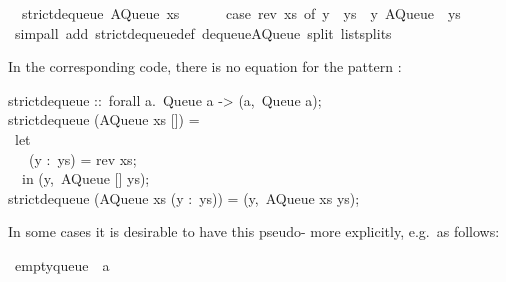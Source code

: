 \begin{isabellebody}
\ \ {\isachardoublequoteopen}strict{\isacharunderscore}dequeue\ {\isacharparenleft}AQueue\ xs\ {\isacharbrackleft}{\isacharbrackright}{\isacharparenright}\ {\isacharequal}\isanewline
\ \ \ \ {\isacharparenleft}case\ rev\ xs\ of\ y\ {\isacharhash}\ ys\ {\isasymRightarrow}\ {\isacharparenleft}y{\isacharcomma}\ AQueue\ {\isacharbrackleft}{\isacharbrackright}\ ys{\isacharparenright}{\isacharparenright}{\isachardoublequoteclose}\isanewline
\ \ \isamarkupfalse%
\ {\isacharparenleft}simp{\isacharunderscore}all\ add{\isacharcolon}\ strict{\isacharunderscore}dequeue{\isacharunderscore}def\ dequeue{\isacharunderscore}AQueue\ split{\isacharcolon}\ list{\isachardot}splits{\isacharparenright}%
\endisatagquote
{\isafoldquote}%
%
\isadelimquote
%
\endisadelimquote
%
\begin{isamarkuptext}%
\noindent In the corresponding code, there is no equation
  for the pattern :%
\end{isamarkuptext}%
\isamarkuptrue%
%
\isadelimquote
%
\endisadelimquote
%
\isatagquote
%
\begin{isamarkuptext}%
\isatypewriter%
\noindent%
\hspace*{0pt}strict{}dequeue ::~forall a.~Queue a -> (a,~Queue a);\\
\hspace*{0pt}strict{}dequeue (AQueue xs []) =\\
\hspace*{0pt} ~let {}\\
\hspace*{0pt} ~~~(y :~ys) = rev xs;\\
\hspace*{0pt} ~{}~in (y,~AQueue [] ys);\\
\hspace*{0pt}strict{}dequeue (AQueue xs (y :~ys)) = (y,~AQueue xs ys);%
\end{isamarkuptext}%
\isamarkuptrue%
%
\endisatagquote
{\isafoldquote}%
%
\isadelimquote
%
\endisadelimquote
%
\begin{isamarkuptext}%
\noindent In some cases it is desirable to have this
  pseudo- more explicitly, e.g.~as follows:%
\end{isamarkuptext}%
\isamarkuptrue%
%
\isadelimquote
%
\endisadelimquote
%
\isatagquote
{}\isamarkupfalse%
\ empty{\isacharunderscore}queue\ {\isacharcolon}{\isacharcolon}\ {\isacharprime}a\isanewline
\isanewline

\end{isabellebody}

